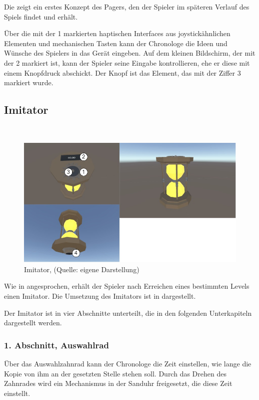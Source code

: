 Die  zeigt ein erstes Konzept des Pagers, den der Spieler im späteren Verlauf des Spiels findet und erhält.

Über die mit der 1 markierten haptischen Interfaces aus joystickähnlichen Elementen und mechanischen Tasten kann der Chronologe die Ideen und Wünsche des Spielers in das Gerät eingeben. Auf dem kleinen Bildschirm, der mit der 2 markiert ist, kann der Spieler seine Eingabe kontrollieren, ehe er diese mit einem Knopfdruck abschickt. Der Knopf ist das Element, das mit der Ziffer 3 markiert wurde.

\subsection{Imitator}
~
\begin{figure}[ht]
\centering
\includegraphics[width=1\linewidth]{content/pictures/Imitator.jpg}
\caption{Imitator, (Quelle: eigene Darstellung)}
\label{fig:imitator}
\end{figure}

Wie in  angesprochen, erhält der Spieler nach Erreichen eines bestimmten Levels einen Imitator. Die Umsetzung des Imitators ist in  dargestellt.

Der Imitator ist in vier Abschnitte unterteilt, die in den folgenden Unterkapiteln dargestellt werden.

\subsubsection{1. Abschnitt, Auswahlrad}
Über das Auswahlzahnrad kann der Chronologe die Zeit einstellen, wie lange die Kopie von ihm an der gesetzten Stelle stehen soll. Durch das Drehen des Zahnrades wird ein Mechanismus in der Sanduhr freigesetzt, die diese Zeit einstellt.

